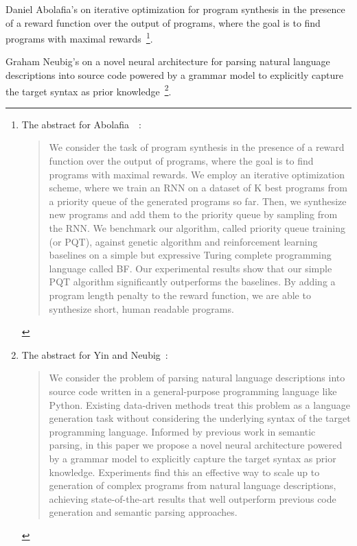 Daniel Abolafia's {} on iterative optimization for program synthesis in the presence of a reward function over the output of programs, where the goal is to find programs with maximal rewards~\cite{AbolafiaetalCoRR-18}\footnote{%
%
  The abstract for Abolafia~\etal{}~\cite{AbolafiaetalCoRR-18}:
%
  \begin{quotation}
%
    We consider the task of program synthesis in the presence of a reward function over the output of programs, where the goal is to find programs with maximal rewards. We employ an iterative optimization scheme, where we train an RNN on a dataset of K best programs from a priority queue of the generated programs so far. Then, we synthesize new programs and add them to the priority queue by sampling from the RNN. We benchmark our algorithm, called priority queue training (or PQT), against genetic algorithm and reinforcement learning baselines on a simple but expressive Turing complete programming language called BF. Our experimental results show that our simple PQT algorithm significantly outperforms the baselines. By adding a program length penalty to the reward function, we are able to synthesize short, human readable programs.
%
  \end{quotation}}.

Graham Neubig's {} on a novel neural architecture for parsing natural language descriptions into source code powered by a grammar model to explicitly capture the target syntax as prior knowledge~\cite{YinandNeubigACL-17}\footnote{%
%
  The abstract for Yin and Neubig~\cite{YinandNeubigACL-17}:
%
  \begin{quotation}
%
    We consider the problem of parsing natural language descriptions into source code written in a general-purpose programming language like Python. Existing data-driven methods treat this problem as a language generation task without considering the underlying syntax of the target programming language. Informed by previous work in semantic parsing, in this paper we propose a novel neural architecture powered by a grammar model to explicitly capture the target syntax as prior knowledge. Experiments find this an effective way to scale up to generation of complex programs from natural language descriptions, achieving state-of-the-art results that well outperform previous code generation and semantic parsing approaches.
%
  \end{quotation}}.

